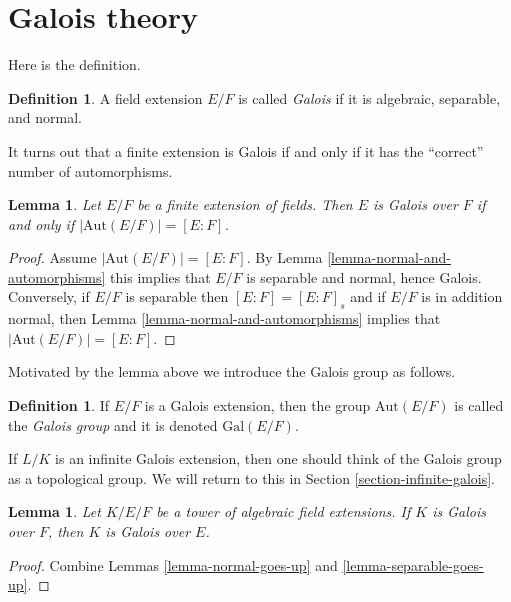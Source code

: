 \documentclass{stacks-project}
\theoremstyle{plain}
\newtheorem{lemma}[subsection]{Lemma}
\theoremstyle{definition}
\newtheorem{definition}[subsection]{Definition}
\theoremstyle{remark}
\numberwithin{equation}{subsection}
\begin{document}
\section{Galois theory}
\label{section-galois-theory}

\noindent
Here is the definition.

\begin{definition}
\label{definition-galois}
A field extension $E/F$ is called {\it Galois} if it is algebraic,
separable, and normal.
\end{definition}

\noindent
It turns out that a finite extension is Galois if and only if it has
the ``correct'' number of automorphisms.

\begin{lemma}
\label{lemma-finite-Galois}
Let $E/F$ be a finite extension of fields. Then $E$ is Galois over $F$
if and only if $|\text{Aut}(E/F)| = [E : F]$.
\end{lemma}

\begin{proof}
Assume $|\text{Aut}(E/F)| = [E : F]$. By
Lemma \ref{lemma-normal-and-automorphisms} this implies
that $E/F$ is separable and normal, hence Galois.
Conversely, if $E/F$ is separable then $[E : F] = [E : F]_s$ and
if $E/F$ is in addition normal, then
Lemma \ref{lemma-normal-and-automorphisms} implies that
$|\text{Aut}(E/F)| = [E : F]$.
\end{proof}

\noindent
Motivated by the lemma above we introduce the Galois group as follows.

\begin{definition}
\label{definition-galois-group}
If $E/F$ is a Galois extension, then the group $\text{Aut}(E/F)$ is
called the {\it Galois group} and it is denoted $\text{Gal}(E/F)$.
\end{definition}

\noindent
If $L/K$ is an infinite Galois extension, then one should think of the
Galois group as a topological group. We will return to this in
Section \ref{section-infinite-galois}.

\begin{lemma}
\label{lemma-galois-goes-up}
Let $K/E/F$ be a tower of algebraic field extensions.
If $K$ is Galois over $F$, then $K$ is Galois over $E$.
\end{lemma}

\begin{proof}
Combine Lemmas \ref{lemma-normal-goes-up} and \ref{lemma-separable-goes-up}.
\end{proof}
\end{document}
